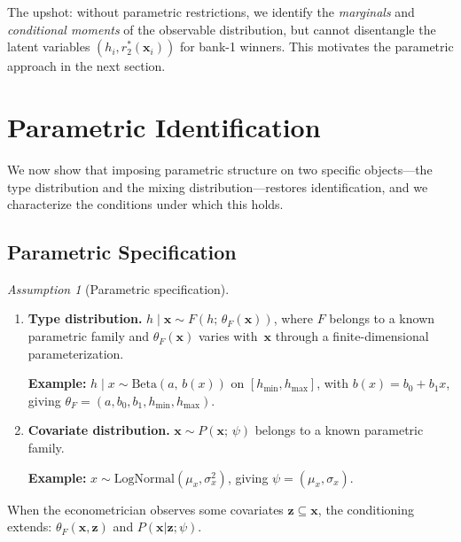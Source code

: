 \documentclass[12pt]{article}
\theoremstyle{plain}
\theoremstyle{plain}
\theoremstyle{definition}  %
\theoremstyle{remark}  %
\newtheorem{ass}[thm]{Assumption}
\begin{document}
\noindent
The upshot: without parametric restrictions, we identify the \emph{marginals} and \emph{conditional moments} of the observable distribution, but cannot disentangle the latent variables $(h_i, r_2^*(\mathbf{x}_i))$ for bank-1 winners.  This motivates the parametric approach in the next section.



\newpage
\section{Parametric Identification}\label{sec:parametric_id}

We now show that imposing parametric structure on two specific objects---the type distribution and the mixing distribution---restores identification, and we characterize the conditions under which this holds.

\subsection{Parametric Specification}\label{sec:spec}

\begin{ass}[Parametric specification]\label{ass:parametric}
\begin{enumerate}
    \item[(i)] \textbf{Type distribution.} $h \mid \mathbf{x} \sim F(h;\, \theta_F(\mathbf{x}))$, where $F$ belongs to a known parametric family and $\theta_F(\mathbf{x})$ varies with~$\mathbf{x}$ through a finite-dimensional parameterization.
    
    \textbf{Example:} $h \mid x \sim \text{Beta}(a,\, b(x))$ on $[h_{\min}, h_{\max}]$, with $b(x) = b_0 + b_1 x$, giving $\theta_F = (a, b_0, b_1, h_{\min}, h_{\max})$.
    
    \item[(ii)] \textbf{Covariate distribution.} $\mathbf{x} \sim P(\mathbf{x};\, \psi)$ belongs to a known parametric family.
    
    \textbf{Example:} $x \sim \text{LogNormal}(\mu_x, \sigma_x^2)$, giving $\psi = (\mu_x, \sigma_x)$.
\end{enumerate}
When the econometrician observes some covariates $\mathbf{z} \subseteq \mathbf{x}$, the conditioning extends: $\theta_F(\mathbf{x}, \mathbf{z})$ and $P(\mathbf{x} | \mathbf{z}; \psi)$.
\end{ass}
\end{document}
